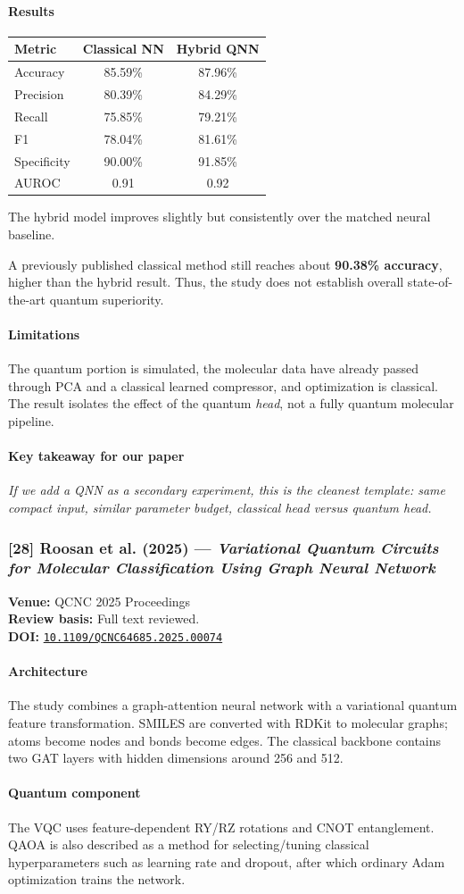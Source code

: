 \documentclass[11pt]{article}
\newcommand{\reviewfield}[2]{\paragraph{#1}#2}
\newcommand{\keytakeaway}[1]{\paragraph{Key takeaway for our paper}\emph{#1}}
\newcommand{\paperdoi}[1]{\href{https://doi.org/#1}{\texttt{#1}}}
\begin{document}
\reviewfield{Results}{
\begin{center}
\begin{tabular}{lcc}
\toprule
Metric & Classical NN & Hybrid QNN\\
\midrule
Accuracy & 85.59\% & 87.96\%\\
Precision & 80.39\% & 84.29\%\\
Recall & 75.85\% & 79.21\%\\
F1 & 78.04\% & 81.61\%\\
Specificity & 90.00\% & 91.85\%\\
AUROC & 0.91 & 0.92\\
\bottomrule
\end{tabular}
\end{center}
The hybrid model improves slightly but consistently over the matched neural baseline.

A previously published classical method still reaches about \textbf{90.38\% accuracy}, higher than the hybrid result. Thus, the study does not establish overall state-of-the-art quantum superiority.
}

\reviewfield{Limitations}{
The quantum portion is simulated, the molecular data have already passed through PCA and a classical learned compressor, and optimization is classical. The result isolates the effect of the quantum \emph{head}, not a fully quantum molecular pipeline.
}

\keytakeaway{If we add a QNN as a secondary experiment, this is the cleanest template: same compact input, similar parameter budget, classical head versus quantum head.}


\subsubsection{[28] Roosan et al. (2025) --- \textit{Variational Quantum Circuits for Molecular Classification Using Graph Neural Network}}
\textbf{Venue:} QCNC 2025 Proceedings\\
\textbf{Review basis:} Full text reviewed.\\
\textbf{DOI:} \paperdoi{10.1109/QCNC64685.2025.00074}

\reviewfield{Architecture}{
The study combines a graph-attention neural network with a variational quantum feature transformation. SMILES are converted with RDKit to molecular graphs; atoms become nodes and bonds become edges. The classical backbone contains two GAT layers with hidden dimensions around 256 and 512.
}

\reviewfield{Quantum component}{
The VQC uses feature-dependent RY/RZ rotations and CNOT entanglement. QAOA is also described as a method for selecting/tuning classical hyperparameters such as learning rate and dropout, after which ordinary Adam optimization trains the network.
}
\end{document}
